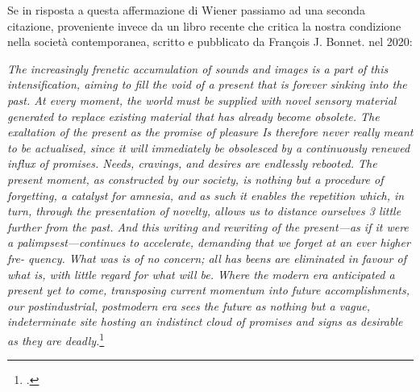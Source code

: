 Se in risposta a questa affermazione di Wiener passiamo ad una seconda citazione, proveniente invece da un libro 
recente che critica la nostra condizione nella società contemporanea, scritto e pubblicato da François J. Bonnet. nel 2020:

\begin{center}
    \vspace{0.5cm}
    \textit{The increasingly frenetic accumulation of sounds and
images is a part of this intensification, aiming to fill the void of
a present that is forever sinking into the past. At every
moment, the world must be supplied with novel sensory
material generated to replace existing material that has
already become obsolete. The exaltation of the present as the
promise of pleasure Is therefore never really meant to be actualised,
since it will immediately be obsolesced by a continuously
renewed influx of promises.
Needs, cravings, and desires
are endlessly rebooted.
The present moment, as constructed by our society, is
nothing but a procedure of forgetting, a catalyst for amnesia,
and as such it enables the repetition which, in turn, through
the presentation of novelty, allows us to distance ourselves
3 little further from the past. And this writing and rewriting
of the present—as if it were a palimpsest—continues to
accelerate, demanding that we forget at an ever higher fre-
quency. What was is of no concern; all has beens are eliminated
in favour of what is, with little regard for what will be.
Where the modern era anticipated a present yet to come,
transposing current momentum into future accomplishments,
our postindustrial, postmodern era sees the future as
nothing but a vague, indeterminate site hosting an indistinct
cloud of promises and signs as desirable as they are deadly.}\footcite{francois_jbonnet_after_death}
\vspace{0.5cm}
\end{center}

